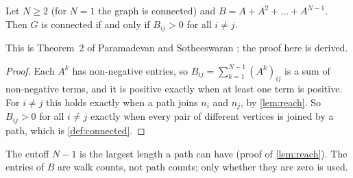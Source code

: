 \begin{theorem}\label{thm:sum}
Let $N\ge 2$ (for $N=1$ the graph is connected) and $B=A+A^2+\dots+A^{N-1}$. Then $G$ is connected if and only if
$B_{ij}>0$ for all $i\ne j$.
\end{theorem}
This is Theorem~2 of Paramadevan and Sotheeswaran
\cite[p.~17]{paramadevan2021adjacency}; the proof here is derived.
\begin{proof}
Each $A^k$ has non-negative entries, so $B_{ij}=\sum_{k=1}^{N-1}(A^k)_{ij}$ is a
sum of non-negative terms, and it is positive exactly when at least one term
is positive. For $i\ne j$ this holds exactly when a path joins $n_i$ and
$n_j$, by \cref{lem:reach}. So $B_{ij}>0$ for all $i\ne j$ exactly when every
pair of different vertices is joined by a path, which is
\cref{def:connected}.
\end{proof}
The cutoff $N-1$ is the largest length a path can have
(proof of \cref{lem:reach}). The entries of $B$ are walk counts, not path counts; only
whether they are zero is used.
